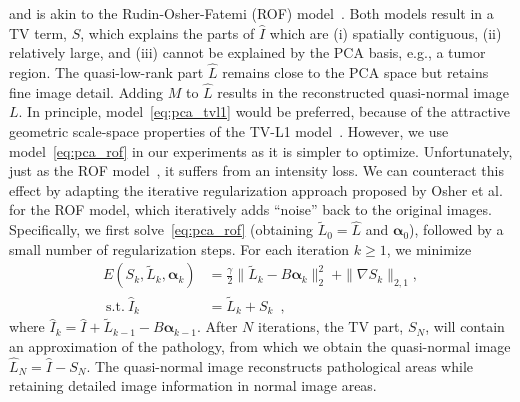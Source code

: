 \documentclass{article}
\begin{document}
and is akin to the Rudin-Osher-Fatemi (ROF) model~\cite{rudin1992}. Both models result in a TV term, $S$, which explains the parts of $\hat{I}$ which are (i) spatially contiguous, (ii) relatively large, and (iii) cannot be explained by the PCA basis, e.g., a tumor region. The quasi-low-rank part $\hat{L}$ remains close to the PCA space but retains fine image detail. Adding $M$ to $\hat{L}$ results in the reconstructed quasi-normal image ${L}$. In principle, model~\eqref{eq:pca_tvl1} would be preferred, because of the attractive geometric scale-space properties of the TV-L1 model~\cite{chan2005}. However, we use model~\eqref{eq:pca_rof} in our experiments as it is simpler to optimize. Unfortunately, just as the ROF model~\cite{chan2005}, it suffers from an intensity loss. We can counteract this effect by adapting the iterative regularization approach proposed by Osher et al.~\cite{osher2005} for the ROF model, which iteratively adds ``noise'' back to the original images. Specifically, we first solve~\eqref{eq:pca_rof} (obtaining $\tilde{L}_0=\hat{L}$ and $\bm{\alpha}_0$), followed by a small number of regularization steps. For each iteration $k\geq 1$, we minimize
%
%
\begin{equation}
\label{eq:rof_reg}
\begin{split}
E(S_{k}, \tilde{L}_{k}, \bm{\alpha}_{k}) &= \frac{\gamma}{2}\|\tilde{L}_{k}-B\bm{\alpha}_{k}\|_2^2~+
\|\nabla S_{k}\|_{2,1}, \\~\text{s.t.}~\hat{I}_{k} &=\tilde{L}_{k} + S_{k}\enspace,
\end{split}
\end{equation}
where $\hat{I}_k = \hat{I} + \tilde{L}_{k-1} - B\bm{\alpha}_{k-1}$. After $N$ iterations, the TV part, $S_N$, will contain an approximation of the pathology, from which we obtain the quasi-normal image $\hat{L}_N = \hat{I}-S_N$. The quasi-normal image reconstructs pathological areas while retaining detailed image information in normal image areas. 

\end{document}
